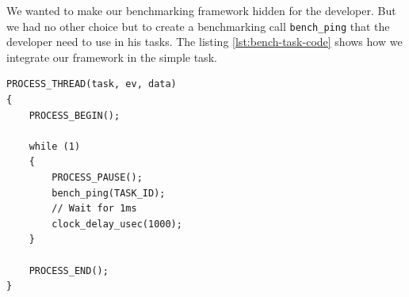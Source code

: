 We wanted to make our benchmarking framework hidden for the developer.
But we had no other choice but to create a benchmarking call \texttt{bench\_ping} that the developer need to use in his tasks.
The listing \ref{lst:bench-task-code} shows how we integrate our framework in the simple task.

\begin{lstlisting}[style=CStyle, label={lst:bench-task-code}, caption={Source code of the task with benchmarking framework calls}]
PROCESS_THREAD(task, ev, data)
{
    PROCESS_BEGIN();

    while (1)
    {
        PROCESS_PAUSE();
        bench_ping(TASK_ID);
        // Wait for 1ms
        clock_delay_usec(1000);
    }

    PROCESS_END();
}
\end{lstlisting}